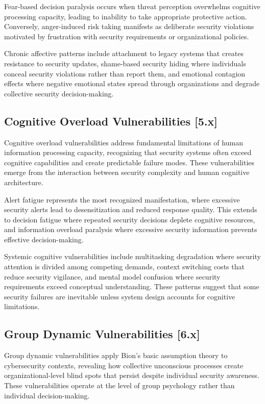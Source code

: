 \documentclass[11pt,a4paper]{article}
\begin{document}
Fear-based decision paralysis occurs when threat perception overwhelms cognitive processing capacity, leading to inability to take appropriate protective action. Conversely, anger-induced risk taking manifests as deliberate security violations motivated by frustration with security requirements or organizational policies.

Chronic affective patterns include attachment to legacy systems that creates resistance to security updates, shame-based security hiding where individuals conceal security violations rather than report them, and emotional contagion effects where negative emotional states spread through organizations and degrade collective security decision-making.

\subsection{Cognitive Overload Vulnerabilities [5.x]}

Cognitive overload vulnerabilities address fundamental limitations of human information processing capacity, recognizing that security systems often exceed cognitive capabilities and create predictable failure modes. These vulnerabilities emerge from the interaction between security complexity and human cognitive architecture.

Alert fatigue represents the most recognized manifestation, where excessive security alerts lead to desensitization and reduced response quality. This extends to decision fatigue where repeated security decisions deplete cognitive resources, and information overload paralysis where excessive security information prevents effective decision-making.

Systemic cognitive vulnerabilities include multitasking degradation where security attention is divided among competing demands, context switching costs that reduce security vigilance, and mental model confusion where security requirements exceed conceptual understanding. These patterns suggest that some security failures are inevitable unless system design accounts for cognitive limitations.

\subsection{Group Dynamic Vulnerabilities [6.x]}

Group dynamic vulnerabilities apply Bion's basic assumption theory to cybersecurity contexts, revealing how collective unconscious processes create organizational-level blind spots that persist despite individual security awareness. These vulnerabilities operate at the level of group psychology rather than individual decision-making.
\end{document}
